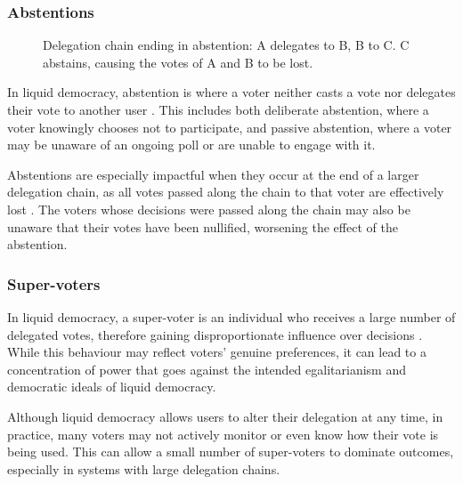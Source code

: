 \subsubsection{Abstentions}
\begin{figure}[h]
    \centering
    \caption{Delegation chain ending in abstention: A delegates to B, B to C. C abstains, causing the votes of A and B to be lost.}
    \label{fig:delegation-abstention}
\end{figure}

In liquid democracy, abstention is where a voter neither casts a vote nor delegates their vote to another user \citep{brill_liquid_2022}. This includes both deliberate abstention, where a voter knowingly chooses not to participate, and passive abstention, where a voter may be unaware of an ongoing poll or are unable to engage with it.

Abstentions are especially impactful when they occur at the end of a larger delegation chain, as all votes passed along the chain to that voter are effectively lost \citep{brill_liquid_2022}. The voters whose decisions were passed along the chain may also be unaware that their votes have been nullified, worsening the effect of the abstention.

\subsubsection{Super-voters}
In liquid democracy, a super-voter is an individual who receives a large number of delegated votes, therefore gaining disproportionate influence over decisions \citep{kling2015votingbehaviourpoweronline}. While this behaviour may reflect voters' genuine preferences, it can lead to a concentration of power that goes against the intended egalitarianism and democratic ideals of liquid democracy.

Although liquid democracy allows users to alter their delegation at any time, in practice, many voters may not actively monitor or even know how their vote is being used. This can allow a small number of super-voters to dominate outcomes, especially in systems with large delegation chains.

